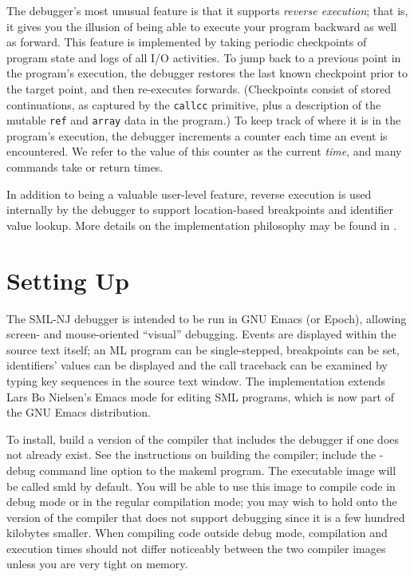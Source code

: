 The debugger's most unusual feature is that it supports 
{\em reverse execution}; that is, it gives you the illusion of being able
to execute your program backward as well as forward.  This feature is 
implemented by taking periodic checkpoints of program state and logs of
all I/O activities.  To jump back to a previous point in the program's 
execution, the debugger restores the last known checkpoint prior to the
target point, and then re-executes forwards.  (Checkpoints consist of
stored continuations, as captured by the \verb'callcc' primitive, plus
a description of the mutable \verb'ref' and \verb'array' data in the program.)
To keep track of where it is in the program's execution, the debugger 
increments a counter each time an event is encountered. 
We refer to the value of this counter as the current {\em time}, 
and many commands take or return times.

In addition to being a valuable 
user-level feature, reverse execution is used internally by the debugger
to support location-based breakpoints and identifier value lookup.
More details on the implementation philosophy may be found in \cite{us}.

\section{Setting Up}
The SML-NJ debugger is intended to be run in GNU Emacs (or Epoch), 
allowing screen- and mouse-oriented ``visual'' debugging.
Events are displayed within the source text
itself; an ML program can be single-stepped, breakpoints can be set,
identifiers' values can be displayed and the call traceback can be
examined by typing key sequences in the source text window.
The implementation extends Lars Bo Nielsen's Emacs mode for
editing SML programs, which is now part of the GNU Emacs distribution.

To install, build a version of the compiler that includes the debugger if
one does not already exist.  See the instructions on building the
compiler; include the -debug command line option to the makeml
program.  The executable image will be called smld by default.  You will be
able to use this image to compile code in debug mode or in the regular
compilation mode; you may wish to hold onto the version of the compiler
that does not support debugging since it is a few hundred kilobytes
smaller.  When compiling code outside
debug mode, compilation and execution times should not differ
noticeably between the two compiler images unless you are very tight on memory.

